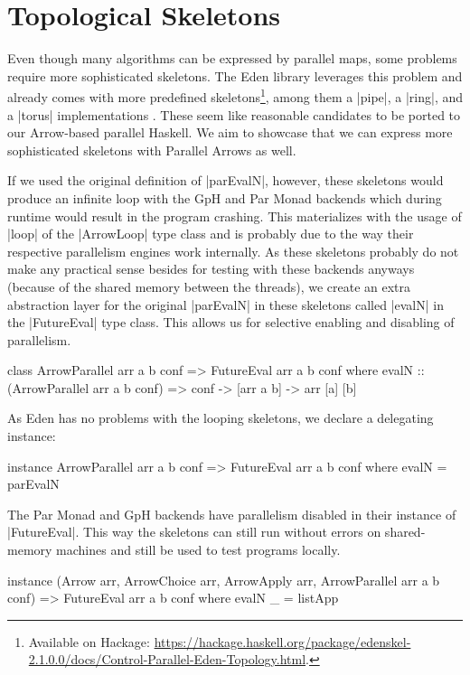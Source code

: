 \section{Topological Skeletons}
\label{sec:topology-skeletons}
Even though many algorithms can be expressed by parallel maps, some problems require more sophisticated skeletons. The Eden library leverages this problem and already comes with more predefined skeletons\footnote{Available on Hackage: \url{https://hackage.haskell.org/package/edenskel-2.1.0.0/docs/Control-Parallel-Eden-Topology.html}.}, among them a |pipe|, a |ring|, and a |torus| implementations \citep{Eden:SkeletonBookChapter02}. These seem like reasonable candidates to be ported to our Arrow-based parallel Haskell. We aim to showcase that we can express more sophisticated skeletons with Parallel Arrows as well.

If we used the original definition of |parEvalN|, however, these skeletons would produce an infinite loop with the GpH and Par Monad backends which during runtime would result in the program crashing. This materializes with the usage of |loop| of the |ArrowLoop| type class and is probably due to the way their respective parallelism engines work internally.  As these skeletons probably do not make any practical sense besides for testing with these backends anyways (because of the shared memory between the threads), we create an extra abstraction layer for the original |parEvalN| in these skeletons called |evalN| in the |FutureEval| type class. This allows us for selective enabling and disabling of parallelism.
\begin{code}
class ArrowParallel arr a b conf => FutureEval arr a b conf where
    evalN :: (ArrowParallel arr a b conf) => conf -> [arr a b] -> arr [a] [b]
\end{code}
As Eden has no problems with the looping skeletons, we declare a delegating instance:
\begin{code}
instance ArrowParallel arr a b conf => FutureEval arr a b conf where
    evalN = parEvalN
\end{code}
The Par Monad and GpH backends have parallelism disabled in their instance of |FutureEval|. This way the skeletons can still run without errors on shared-memory machines and still be used to test programs locally.
\begin{code}
instance (Arrow arr, ArrowChoice arr, ArrowApply arr,
    ArrowParallel arr a b conf) => FutureEval arr a b conf where
    evalN _ = listApp
\end{code}

